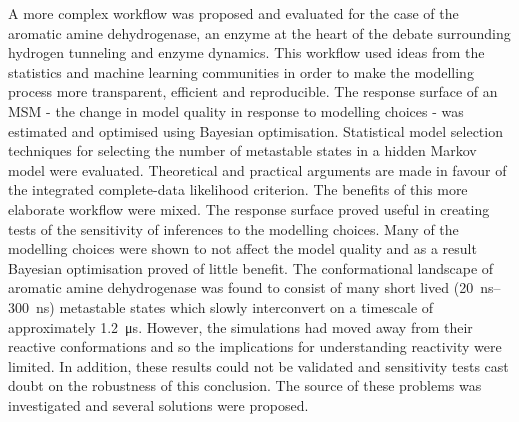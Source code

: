 \begin{SingleSpace}
A more complex workflow was proposed and evaluated for the case of the aromatic amine dehydrogenase, an enzyme at the heart of the debate surrounding hydrogen tunneling and enzyme dynamics.  This workflow used ideas from the statistics and machine learning communities in order to make the modelling  process more transparent, efficient and reproducible.  The response surface of an MSM - the change in model quality in response to modelling choices - was estimated and optimised using Bayesian optimisation. Statistical model selection techniques for selecting the number of metastable states in a hidden Markov model were evaluated. Theoretical and practical arguments are made in favour of the integrated complete-data likelihood criterion. The benefits of this more elaborate workflow were mixed.  The response surface proved useful in creating tests of the sensitivity of inferences to the modelling choices.  Many of the modelling choices were shown to not affect the model quality and as a result Bayesian optimisation proved of little benefit. The conformational landscape of aromatic amine dehydrogenase was found to consist of many short lived  (\SIrange{20}{300}{\nano\second}) metastable states which slowly interconvert on a timescale of approximately \SI{1.2}{\micro\second}. However, the simulations had moved away from their reactive conformations and so the implications for understanding reactivity were limited. In addition, these results could not be validated and sensitivity tests cast doubt on the robustness of this conclusion. The source of these problems was investigated and several solutions were proposed.  


 
 

\end{SingleSpace}
\clearpage